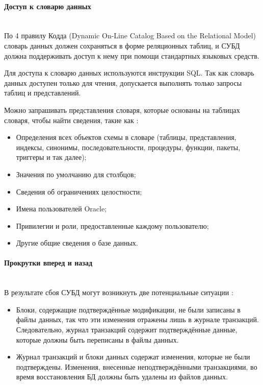 \paragraph{Доступ к словарю данных} ~\\

По 4 правилу Кодда (Dynamic On-Line Catalog Based on the Relational Model) словарь данных должен сохраняться в форме реляционных таблиц, и СУБД должна поддерживать доступ к нему при помощи стандартных языковых средств.


Для доступа к словарю данных используются инструкции SQL. Так как словарь данных доступен только для чтения, допускается выполнять только запросы таблиц и представлений.

Можно запрашивать представления словаря, которые основаны на таблицах словаря, чтобы найти сведения, такие как \autocite{SqlOracle}:
\begin{itemize}
    \item Определения всех объектов схемы в словаре (таблицы, представления, индексы, синонимы, последовательности, процедуры, функции, пакеты, триггеры и так далее);
    \item Значения по умолчанию для столбцов;
    \item Сведения об ограничениях целостности;
    \item Имена пользователей Oracle;
    \item Привилегии и роли, предоставленные каждому пользователю;
    \item Другие общие сведения о базе данных.
\end{itemize}


\paragraph{Прокрутки вперед и назад} ~\\

В результате сбоя СУБД могут возникнуть две потенциальные ситуации \autocite{Karpova2009}:

\begin{itemize}
    \item Блоки, содержащие подтверждённые модификации, не были записаны в файлы данных, так что эти изменения отражены лишь в журнале транзакций. Следовательно, журнал транзакций содержит подтверждённые данные, которые должны быть переписаны в файлы данных.
    \item Журнал транзакций и блоки данных содержат изменения, которые не были подтверждены. Изменения, внесенные неподтверждёнными транзакциями, во время восстановления БД должны быть удалены из файлов данных.
\end{itemize}

